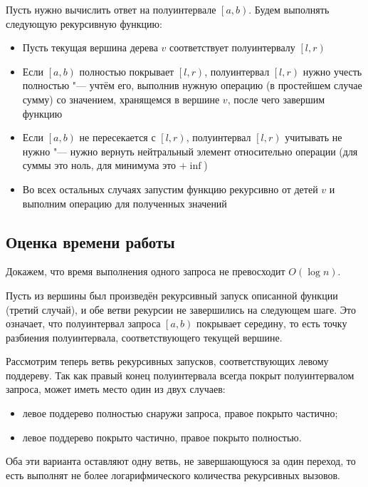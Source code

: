 \documentclass[a4paper,12pt]{article}
\begin{document}
    Пусть нужно вычислить ответ на полуинтервале
    $\left[a, b\right)$. Будем выполнять следующую
    рекурсивную функцию:
    \begin{itemize}
      \item Пусть текущая вершина дерева $v$ соответствует
        полуинтервалу $\left[l, r\right)$
      \item Если $\left[a, b\right)$ полностью покрывает
        $\left[l, r\right)$, полуинтервал
        $\left[l, r\right)$ нужно учесть полностью "---
        учтём его, выполнив нужную операцию (в простейшем
        случае сумму) со значением, хранящемся в вершине $v$,
        после чего завершим функцию
      \item Если $\left[a, b\right)$ не пересекается с
        $\left[l, r\right)$, полуинтервал
        $\left[l, r\right)$ учитывать не нужно "---
        нужно вернуть нейтральный элемент относительно
        операции (для суммы это ноль, для минимума это
        $+\inf$)
      \item Во всех остальных случаях запустим функцию
        рекурсивно от детей $v$ и выполним операцию для
        полученных значений
    \end{itemize}

    \subsection{Оценка времени работы}

    Докажем, что время выполнения одного запроса не
    превосходит $O(\log n)$.

    Пусть из вершины был произведён рекурсивный запуск
    описанной функции (третий случай), и обе ветви рекурсии
    не завершились на следующем шаге. Это означает, что
    полуинтервал запроса $\left[a, b\right)$ покрывает середину,
    то есть точку разбиения полуинтервала, соответствующего
    текущей вершине.

    Рассмотрим теперь ветвь рекурсивных запусков, соответствующих
    левому поддереву. Так как правый конец полуинтервала всегда
    покрыт полуинтервалом запроса, может иметь место один
    из двух случаев:
    \begin{itemize}
      \item левое поддерево полностью снаружи запроса, правое
        покрыто частично;
      \item левое поддерево покрыто частично, правое покрыто
        полностью.
    \end{itemize}
    Оба эти варианта оставляют одну ветвь, не завершающуюся за
    один переход, то есть выполнят не более логарифмического
    количества рекурсивных вызовов.
\end{document}
